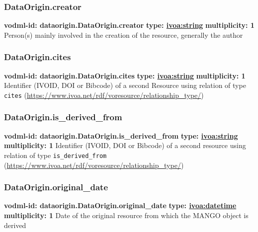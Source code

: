     \subsubsection{DataOrigin.creator}
      \textbf{vodml-id: dataorigin.DataOrigin.creator} \newline
      \textbf{type: \hyperref[sect:ivoa]{ivoa:string}} \newline
      \textbf{multiplicity: 1} \newline 
      Person(s) mainly involved in the creation of the resource, generally the author

    \subsubsection{DataOrigin.cites}
      \textbf{vodml-id: dataorigin.DataOrigin.cites} \newline
      \textbf{type: \hyperref[sect:ivoa]{ivoa:string}} \newline
      \textbf{multiplicity: 1} \newline 
      Identifier (IVOID, DOI or Bibcode) of a second Resource using relation of type \texttt{cites} (\url{https://www.ivoa.net/rdf/voresource/relationship\_type/})

    \subsubsection{DataOrigin.is\_derived\_from}
      \textbf{vodml-id: dataorigin.DataOrigin.is\_derived\_from} \newline
      \textbf{type: \hyperref[sect:ivoa]{ivoa:string}} \newline
      \textbf{multiplicity: 1} \newline 
      Identifier (IVOID, DOI or Bibcode) of a second resource using relation of type \texttt{is\_derived\_from} (\url{https://www.ivoa.net/rdf/voresource/relationship\_type/})

    \subsubsection{DataOrigin.original\_date}
      \textbf{vodml-id: dataorigin.DataOrigin.original\_date} \newline
      \textbf{type: \hyperref[sect:ivoa]{ivoa:datetime}} \newline
      \textbf{multiplicity: 1} \newline 
      Date of the original resource from which the MANGO object is derived

